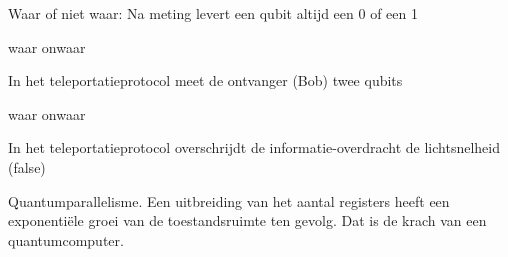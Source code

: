 \documentclass[a4paper, addpoints, 12pt
    , answers    %
    ]{exam}
\begin{document}
\begin{questions}
\question [1]
Waar of niet waar: Na meting levert een qubit altijd een 0 of een 1
\begin{oneparchoices}
\correctchoice waar
\choice onwaar
\end{oneparchoices}


\question[1]
In het teleportatieprotocol meet de ontvanger (Bob) twee qubits
\begin{oneparchoices}
\choice waar
\correctchoice onwaar
\end{oneparchoices}

In het teleportatieprotocol overschrijdt de  informatie-overdracht de lichtsnelheid (false)

\question[1]
Quantumparallelisme. Een uitbreiding van het aantal registers heeft een exponenti\"ele groei van de toestandsruimte ten gevolg. Dat is de krach van een quantumcomputer.
\end{questions}
\end{document}
